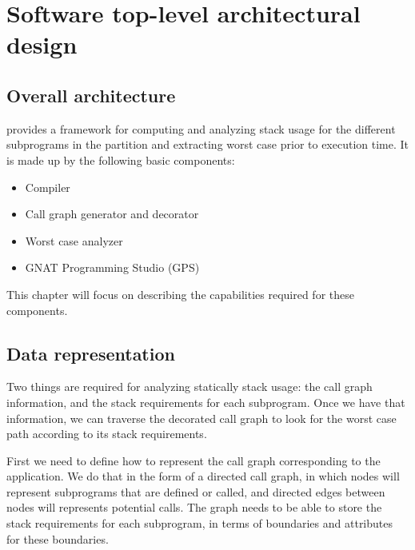 \chapter{Software top-level architectural design}
\label{ch:toplevel}

\section{Overall architecture}
\label{sc:architecture}

\ssat{} provides a framework for computing and analyzing stack usage
for the different subprograms in the partition and extracting worst case
prior to execution time. It is made up by the following basic components:

\begin{itemize}

\item Compiler

\item Call graph generator and decorator

\item Worst case analyzer

\item GNAT Programming Studio (GPS)

\end{itemize}

This chapter will focus on describing the capabilities required for these
components.

\section{Data representation}
\label{sc:data}

Two things are required for analyzing statically stack usage: the call
graph information, and the stack requirements for each
subprogram. Once we have that information, we can traverse the
decorated call graph to look for the worst case path according to its
stack requirements.

First we need to define how to represent the call graph corresponding
to the application. We do that in the form of a directed call graph,
in which nodes will represent subprograms that are defined or called,
and directed edges between nodes will represents potential calls. The
graph needs to be able to store the stack requirements for each
subprogram, in terms of boundaries and attributes for these
boundaries.

